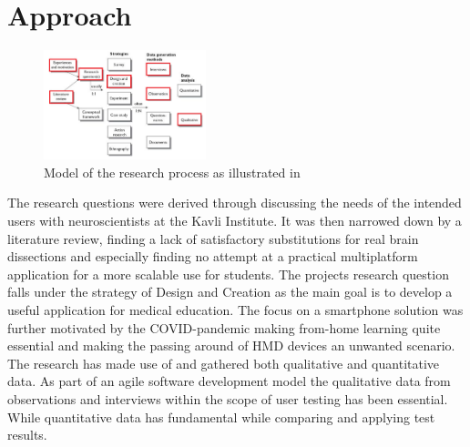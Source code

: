 


\section{Approach}



\begin{figure}
    \begin{center}
        \includegraphics[width=0.42\textwidth]{fig/researchplan_image}
    \end{center}
    \caption{Model of the research process as illustrated in \citet{oates2006}}
    \label{researchplan_img}
\end{figure}

The research questions were derived through discussing the needs of the intended users with neuroscientists at the Kavli Institute. It was then narrowed down by a literature review, finding a lack of satisfactory substitutions for real brain dissections and especially finding no attempt at a practical multiplatform application for a more scalable use for students. The projects research question falls under the strategy of Design and Creation as the main goal is to develop a useful application for medical education. The focus on a smartphone solution was further motivated by the COVID-pandemic making from-home learning quite essential and making the passing around of HMD devices an unwanted scenario. The research has made use of and gathered both qualitative and quantitative data. As part of an agile software development model the qualitative data from observations and interviews within the scope of user testing has been essential. While quantitative data has fundamental while comparing and applying test results.

